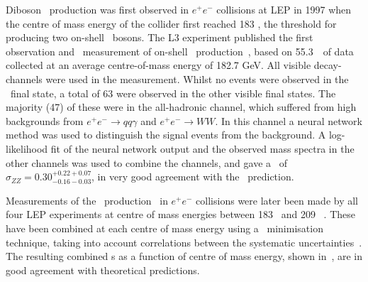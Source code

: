 Diboson \ZZ\ production was first observed in $e^+e^-$ collisions at LEP in 1997
when the centre of mass energy of the collider first reached 183 \gev, the
threshold for producing two on-shell \Z\ bosons.
The L3 experiment published the first observation and \cx\ measurement
of on-shell \ZZ\ production~\cite{Acciarri1999281}, based on 55.3~\ipb\
of data collected at an average centre-of-mass energy of 182.7 GeV. All visible
decay-channels were used in the measurement. Whilst no events were
observed in the \llll\ final state, a total of 63 were observed in
the other visible final states. The majority (47) of these were in the
all-hadronic channel, which suffered from high backgrounds from $e^+e^-
\rightarrow qq \gamma$ and $e^+e^- \rightarrow WW$. In this channel a neural
network method was used to distinguish the signal events from the background. A
log-likelihood fit of the neural network output and the observed mass spectra in
the other channels was used to combine the channels, and gave a \cx\ of
$\sigma_{ZZ} = 0.30^{+0.22 +0.07}_{-0.16 -0.03}$, in very good agreement with
the \sm\ prediction. 

Measurements of the \ZZ\ production \cx\ in $e^+e^-$ collisions were later
been made by all four LEP experiments at centre of mass energies between 183
\gev\ and 209
\gev~\cite{Abbiendi:2003va,Abdallah:2003dv,Acciarri:1999ug,Schael:1166743}.
These have been combined at each centre of mass energy using a \chisquared\
minimisation technique, taking into account correlations between the systematic
uncertainties~\cite{bib:LEPEW2006}. The resulting combined \cx s as a
function of centre of mass energy, shown in~\fig{lep-cx}, are in good agreement with
theoretical predictions.

